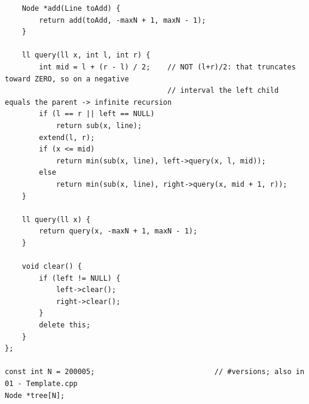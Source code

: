 \documentclass[9pt,a4paper,twocolumn]{extarticle}
\begin{document}
\begin{lstlisting}
    Node *add(Line toAdd) {
        return add(toAdd, -maxN + 1, maxN - 1);
    }

    ll query(ll x, int l, int r) {
        int mid = l + (r - l) / 2;    // NOT (l+r)/2: that truncates toward ZERO, so on a negative
                                      // interval the left child equals the parent -> infinite recursion
        if (l == r || left == NULL)
            return sub(x, line);
        extend(l, r);
        if (x <= mid)
            return min(sub(x, line), left->query(x, l, mid));
        else
            return min(sub(x, line), right->query(x, mid + 1, r));
    }

    ll query(ll x) {
        return query(x, -maxN + 1, maxN - 1);
    }

    void clear() {
        if (left != NULL) {
            left->clear();
            right->clear();
        }
        delete this;
    }
};

const int N = 200005;                            // #versions; also in 01 - Template.cpp
Node *tree[N];
\end{lstlisting}

\filbreak
\end{document}
